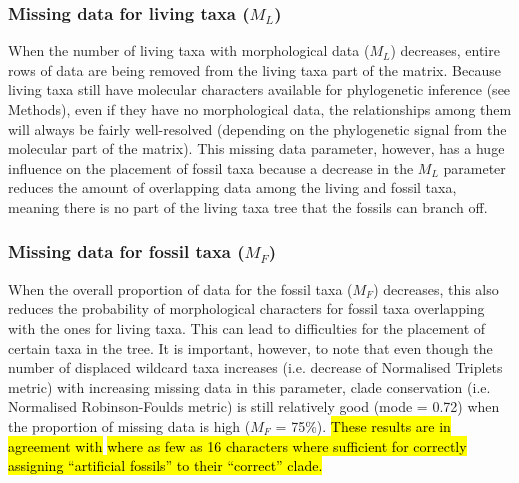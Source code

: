 \documentclass[12pt,letterpaper]{article}
\begin{document}
\subsubsection{Missing data for living taxa ($M_{L}$)}
When the number of living taxa with morphological data ($M_{L}$) decreases, entire rows of data are being removed from the living taxa part of the matrix.
Because living taxa still have molecular characters available for phylogenetic inference (see Methods), even if they have no morphological data, the relationships among them will always be fairly well-resolved (depending on the phylogenetic signal from the molecular part of the matrix).
This missing data parameter, however, has a huge influence on the placement of fossil taxa because a decrease in the $M_{L}$ parameter reduces the amount of overlapping data among the living and fossil taxa, meaning there is no part of the living taxa tree that the fossils can branch off.

\subsubsection{Missing data for fossil taxa ($M_{F}$)}
When the overall proportion of data for the fossil taxa ($M_{F}$) decreases, this also reduces the probability of morphological characters for fossil taxa overlapping with the ones for living taxa.
This can lead to difficulties for the placement of certain taxa in the tree.
It is important, however, to note that even though the number of displaced wildcard taxa increases (i.e. decrease of Normalised Triplets metric) with increasing missing data in this parameter, clade conservation (i.e. Normalised Robinson-Foulds metric) is still relatively good (mode = 0.72) when the proportion of missing data is high ($M_{F}$ = 75\%).
\hl{These results are in agreement with }\cite{manosphylogeny2007}\hl{ where as few as 16 characters where sufficient for correctly assigning ``artificial fossils'' to their ``correct'' clade.}
\end{document}
